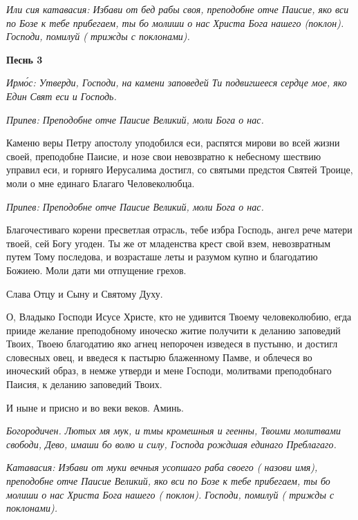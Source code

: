 \itshape Или сия катавасия:\normalfont{} Избави от бед рабы своя, преподобне отче Паисие, яко вси по Бозе к тебе прибегаем, ты бо молиши о нас Христа Бога нашего (\itshape поклон\normalfont{}). Господи, помилуй ( \itshape трижды с поклонами\normalfont{}).





\bfseries Песнь 3\normalfont{}


\itshape Ирмо́с:\normalfont{} Утверди, Господи, на камени заповедей Ти подвигшееся сердце мое, яко Един Свят еси и Господь.


\itshape Припев:\normalfont{} Преподобне отче Паисие Великий, моли Бога о нас.


Каменю веры Петру апостолу уподобился еси, распятся мирови во всей жизни своей, преподобне Паисие, и нозе свои невозвратно к небесному шествию управил еси, и горняго Иерусалима достигл, со святыми предстоя Святей Троице, моли о мне единаго Благаго Человеколюбца.


\itshape Припев:\normalfont{} Преподобне отче Паисие Великий, моли Бога о нас.


Благочестиваго корени пресветлая отрасль, тебе избра Господь, ангел рече матери твоей, сей Богу угоден. Ты же от младенства крест свой взем, невозвратным путем Тому последова, и возрасташе леты и разумом купно и благодатию Божиею. Моли дати ми отпущение грехов.


Слава Отцу и Сыну и Святому Духу.


О, Владыко Господи Исусе Христе, кто не удивится Твоему человеколюбию, егда прииде желание преподобному иноческо житие получити к деланию заповедий Твоих, Твоею благодатию яко агнец непорочен изведеся в пустыню, и достигл словесных овец, и введеся к пастырю блаженному Памве, и облечеся во иноческий образ, в немже утверди и мене Господи, молитвами преподобнаго Паисия, к деланию заповедий Твоих.


И ныне и присно и во веки веков. Аминь.


\itshape Богородичен.\normalfont{} Лютых мя мук, и тмы кромешныя и геенны, Твоими молитвами свободи, Дево, имаши бо волю и силу, Господа рождшая единаго Преблагаго.


\itshape Катавасия:\normalfont{} Избави от муки вечныя усопшаго раба своего ( \itshape назови имя\normalfont{}), преподобне отче Паисие Великий, яко вси по Бозе к тебе прибегаем, ты бо молиши о нас Христа Бога нашего ( \itshape поклон\normalfont{}). Господи, помилуй ( \itshape трижды с поклонами\normalfont{}).






